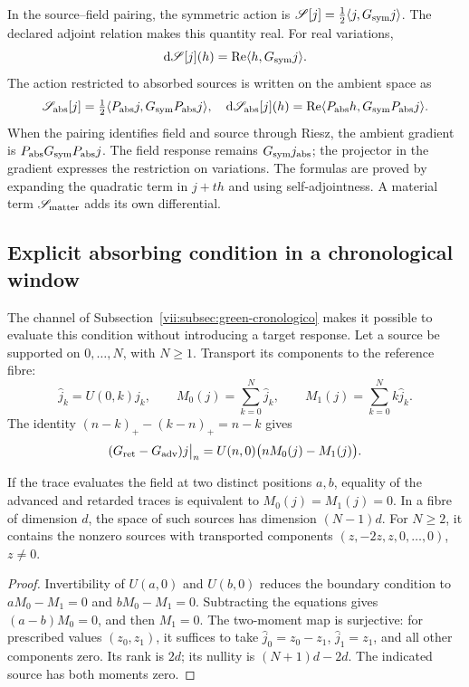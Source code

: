 In the source--field pairing, the symmetric action is
\(\mathscr S[j]=\tfrac12\langle j,G_{\rm sym}j\rangle\).
The declared adjoint relation makes this quantity real. For real variations,
\[
 \mathrm d\mathscr S[j](h)
 =\operatorname{Re}\langle h,G_{\rm sym}j\rangle.
\]
The action restricted to absorbed sources is written on the ambient
space as
\begin{equation}
 \mathscr S_{\rm abs}[j]
 =\tfrac12\langle P_{\rm abs}j,G_{\rm sym}P_{\rm abs}j\rangle,
 \quad
 \mathrm d\mathscr S_{\rm abs}[j](h)
 =\operatorname{Re}\langle P_{\rm abs}h,G_{\rm sym}P_{\rm abs}j\rangle.
 \label{vii:eq:variacion-restringida-absorcion}
\end{equation}
When the pairing identifies field and source through Riesz, the ambient
gradient is \(P_{\rm abs}G_{\rm sym}P_{\rm abs}j\).
The field response remains \(G_{\rm sym}j_{\rm abs}\); the
projector in the gradient expresses the restriction on variations.
The formulas are proved by expanding the quadratic term in
\(j+th\) and using self-adjointness. A material term
\(\mathscr S_{\rm matter}\) adds its own differential.

\subsection{Explicit absorbing condition in a chronological window}
\label{vii:subsec:absorcion-momentos}

The channel of Subsection~\ref{vii:subsec:green-cronologico} makes it possible
to evaluate this condition without introducing a target response. Let a
source be supported on \(0,\ldots,N\), with \(N\geq1\). Transport
its components to the reference fibre:
\[
 \widehat j_k=U(0,k)j_k,\qquad
 M_0(j)=\sum_{k=0}^N\widehat j_k,\qquad
 M_1(j)=\sum_{k=0}^Nk\widehat j_k.
\]
The identity \((n-k)_+-(k-n)_+=n-k\) gives
\begin{equation}
 (G_{\rm ret}-G_{\rm adv})j\big|_n
 =U(n,0)\bigl(nM_0(j)-M_1(j)\bigr).
 \label{vii:eq:diferencia-green-momentos}
\end{equation}

\begin{proposition}
\label{vii:prop:absorcion-momentos}
If the trace evaluates the field at two distinct positions \(a,b\),
equality of the advanced and retarded traces is equivalent to
\(M_0(j)=M_1(j)=0\). In a fibre of dimension \(d\), the space
of such sources has dimension \((N-1)d\). For \(N\geq2\),
it contains the nonzero sources with transported components
\((z,-2z,z,0,\ldots,0)\), \(z\neq0\).
\end{proposition}
\begin{proof}
Invertibility of \(U(a,0)\) and \(U(b,0)\) reduces the boundary
condition to \(aM_0-M_1=0\) and \(bM_0-M_1=0\).
Subtracting the equations gives \((a-b)M_0=0\), and then \(M_1=0\).
The two-moment map is surjective: for prescribed values
\((z_0,z_1)\), it suffices to take
\(\widehat j_0=z_0-z_1\), \(\widehat j_1=z_1\), and all other
components zero. Its rank is \(2d\); its nullity is
\((N+1)d-2d\). The indicated source has both moments zero.
\end{proof}


